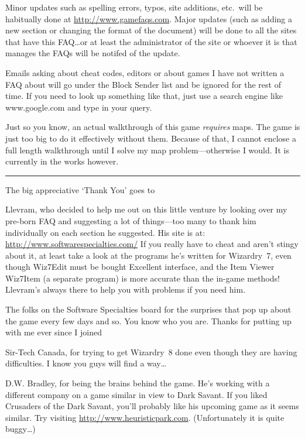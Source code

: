 \documentclass[12pt]{article}
\begin{document}
Minor updates such as spelling errors, typos, site additions, etc.\ will
be habitually done at \url{http://www.gamefaqs.com}. Major updates (such
as adding a new section or changing the format of the document) will be
done to all the sites that have this FAQ\ldots{}or at least the
administrator of the site or whoever it is that manages the FAQs will be
notifed of the update.

Emails asking about cheat codes, editors or about games I have not
written a FAQ about will go under the Block Sender list and be ignored
for the rest of time. If you need to look up something like that, just
use a search engine like www.google.com and type in your query.

Just so you know, an actual walkthrough of this game \emph{requires}
maps. The game is just too big to do it effectively without them.
Because of that, I cannot enclose a full length walkthrough until I
solve my map problem---otherwise I would. It is currently in the works
however.

\begin{center}\rule{0.5\linewidth}{\linethickness}\end{center}

The big appreciative `Thank You' goes to

Llevram, who decided to help me out on this little venture by looking over my
pre-born FAQ and suggesting a lot of things---too many to thank him
individually on each section he suggested. His site is at:
\url{http://www.softwarespecialties.com/} If you really have to cheat and
aren't stingy about it, at least take a look at the programs he's written for
Wizardry~7, even though Wiz7Edit must be bought Excellent interface, and the
Item Viewer Wiz7Item (a separate program) is more accurate than the in-game
methods! Llevram's always there to help you with problems if you need him.

The folks on the Software Specialties board for the surprises that pop
up about the game every few days and so. You know who you are. Thanks
for putting up with me ever since I joined

Sir-Tech Canada, for trying to get Wizardry~8 done even though they are
having difficulties. I know you guys will find a way\ldots{}

D.W. Bradley, for being the brains behind the game. He's working with a
different company on a game similar in view to Dark Savant. If you liked
Crusaders of the Dark Savant, you'll probably like his upcoming game as
it seems similar. Try visiting \url{http://www.heuristicpark.com}.
(Unfortunately it is quite buggy\ldots{})
\end{document}
